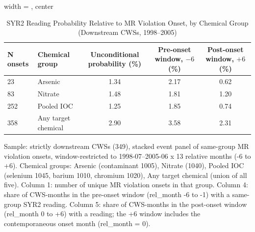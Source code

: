 \begin{table}[htbp]
\caption{\label{tab:mr_reading_onset_summary} SYR2 Reading Probability Relative to MR Violation Onset, by Chemical Group (Downstream CWSs, 1998--2005)}
\bigskip
\centering
\begin{adjustbox}{width = \textwidth, center}
\begin{tabular}{llccc}
\toprule
N onsets & Chemical group & Unconditional probability (\%) & Pre-onset window, $-6$ (\%) & Post-onset window, $+6$ (\%) \\
\midrule
23 & Arsenic & 1.34 & 2.17 & 0.62 \\
83 & Nitrate & 1.48 & 1.81 & 1.20 \\
252 & Pooled IOC & 1.25 & 1.85 & 0.74 \\
358 & Any target chemical & 2.90 & 3.58 & 2.31 \\
\bottomrule
\end{tabular}
\end{adjustbox}
{\tiny\linespread{1}\selectfont \par \raggedright 
Sample: strictly downstream CWSs (349), stacked event panel of same-group MR violation onsets, window-restricted to 1998-07--2005-06 x 13 relative months (-6 to +6). Chemical groups: Arsenic (contaminant 1005), Nitrate (1040), Pooled IOC (selenium 1045, barium 1010, chromium 1020), Any target chemical (union of all five). Column 1: number of unique MR violation onsets in that group. Column 4: share of CWS-months in the pre-onset window (rel\_month -6 to -1) with a same-group SYR2 reading. Column 5: share of CWS-months in the post-onset window (rel\_month 0 to +6) with a reading; the +6 window includes the contemporaneous onset month (rel\_month = 0).
}
\end{table}
